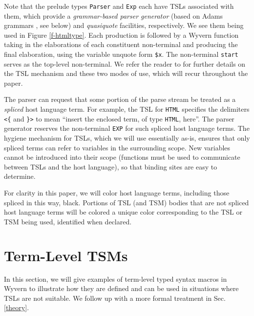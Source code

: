 \documentclass{sig-alternate}
\begin{document}
Note that the prelude types \verb|Parser| and \verb|Exp| each have TSLs associated with them, which provide a \emph{grammar-based parser generator} (based on Adams grammars \cite{Adams:2013:PPI:2429069.2429129}, see below) and \emph{quasiquote} facilities, respectively. We see them being used in Figure \ref{f-htmltype}. Each production is followed by a Wyvern function taking in the elaborations of each constituent non-terminal and producing the final elaboration, using the variable unquote form \verb|$x|. The non-terminal \verb|start| serves as the top-level non-terminal. We refer the reader to \cite{TSLs} for further details on the TSL mechanism and these two modes of use, which will recur throughout the paper.

The parser can request that some portion of the parse stream be treated as a \emph{spliced} host language term. For example, the TSL for \verb|HTML| specifies the delimiters \verb|<{| and \verb|}>| to mean ``insert the enclosed term, of type \verb|HTML|, here''. The parser generator reserves the non-terminal \verb|EXP| for such spliced host language terms. The hygiene mechanism for TSLs, which we will use essentially as-is, ensures that only spliced terms can refer to variables in the surrounding scope. New variables cannot be introduced into their scope (functions must be used to communicate between TSLs and the host language), so that binding sites are easy to determine.

For clarity in this paper, we will color host language terms, including those spliced in this way, black. Portions of TSL (and TSM) bodies that are not spliced host language terms will be colored a unique color corresponding to the TSL or TSM being used, identified when declared. 

\section{Term-Level TSM\lowercase{s}}\label{tsms-term}
In this section, we will give examples of term-level typed syntax macros in Wyvern to illustrate how they are defined and can be used in situations where TSLs are not suitable. We follow up with a more formal treatment in Sec. \ref{theory}. 

\end{document}
